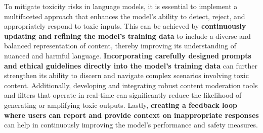 To mitigate toxicity risks in language models, it is essential to implement a multifaceted approach that enhances the model's ability to detect, reject, and appropriately respond to toxic inputs. This can be achieved by \textbf{continuously updating and refining the model's training data} to include a diverse and balanced representation of content, thereby improving its understanding of nuanced and harmful language. \textbf{Incorporating carefully designed prompts and ethical guidelines directly into the model's training data } can further strengthen its ability to discern and navigate complex scenarios involving toxic content. Additionally, developing and integrating robust content moderation tools and filters that operate in real-time can significantly reduce the likelihood of generating or amplifying toxic outputs. Lastly, \textbf{creating a feedback loop where users can report and provide context on inappropriate responses} can help in continuously improving the model's performance and safety measures.